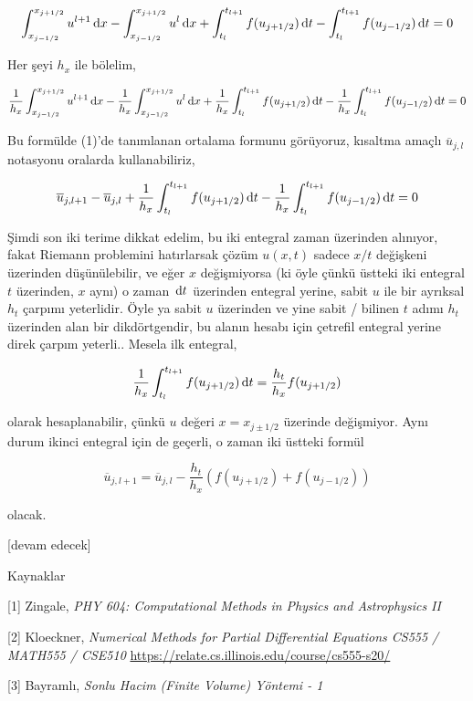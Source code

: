 \documentclass[12pt,fleqn]{article}\usepackage{../../common}
\begin{document}
$$
\int_{x_{j-1/2}}^{x_{j+1/2}} u^{l+1} \,\mathrm{d} x -
\int_{x_{j-1/2}}^{x_{j+1/2}} u^{l} \,\mathrm{d} x  +
\int_{t_l}^{t_{l+1}} f(u_{j+1/2}) \,\mathrm{d} t  -
\int_{t_l}^{t_{l+1}} f(u_{j-1/2}) \,\mathrm{d} t = 0
$$

Her şeyi $h_x$ ile bölelim,

$$
\frac{1}{h_x} \int_{x_{j-1/2}}^{x_{j+1/2}} u^{l+1} \,\mathrm{d} x -
\frac{1}{h_x} \int_{x_{j-1/2}}^{x_{j+1/2}} u^{l} \,\mathrm{d} x  +
\frac{1}{h_x} \int_{t_l}^{t_{l+1}} f(u_{j+1/2}) \,\mathrm{d} t  -
\frac{1}{h_x} \int_{t_l}^{t_{l+1}} f(u_{j-1/2}) \,\mathrm{d} t = 0
$$

Bu formülde (1)'de tanımlanan ortalama formunu görüyoruz, kısaltma amaçlı
$\overline{u}_{j,l}$ notasyonu oralarda kullanabiliriz,

$$
\overline{u}_{j,l+1} - \overline{u}_{j,l} + 
\frac{1}{h_x} \int_{t_l}^{t_{l+1}} f(u_{j+1/2}) \,\mathrm{d} t  -
\frac{1}{h_x} \int_{t_l}^{t_{l+1}} f(u_{j-1/2}) \,\mathrm{d} t = 0
$$

Şimdi son iki terime dikkat edelim, bu iki entegral zaman üzerinden alınıyor,
fakat Riemann problemini hatırlarsak çözüm $u(x,t)$ sadece $x/t$ değişkeni
üzerinden düşünülebilir, ve eğer $x$ değişmiyorsa (ki öyle çünkü üstteki iki
entegral $t$ üzerinden, $x$ aynı) o zaman $\,\mathrm{d} t$ üzerinden entegral yerine,
sabit $u$ ile bir ayrıksal $h_t$ çarpımı yeterlidir. Öyle ya sabit $u$ üzerinden
ve yine sabit / bilinen $t$ adımı $h_t$ üzerinden alan bir dikdörtgendir, bu
alanın hesabı için çetrefil entegral yerine direk çarpım yeterli.. Mesela ilk
entegral,

$$
\frac{1}{h_x} \int_{t_l}^{t_{l+1}} f(u_{j+1/2}) \,\mathrm{d} t =
\frac{h_t}{h_x} f(u_{j+1/2})
$$

olarak hesaplanabilir, çünkü $u$ değeri $x = x_{j \pm 1/2}$ üzerinde değişmiyor.
Aynı durum ikinci entegral için de geçerli, o zaman iki üstteki formül

$$
\overline{u}_{j,l+1} = \overline{u}_{j,l} -
\frac{h_t}{h_x} ( f(u_{j+1/2}) + f(u_{j-1/2}) )
$$

olacak.

[devam edecek]
  
Kaynaklar

[1] Zingale, {\em PHY 604: Computational Methods in Physics and Astrophysics II}

[2] Kloeckner, {\em Numerical Methods for Partial Differential Equations CS555 / MATH555 / CSE510}
    \url{https://relate.cs.illinois.edu/course/cs555-s20/}

[3] Bayramlı, {\em Sonlu Hacim (Finite Volume) Yöntemi - 1}    
\end{document}
